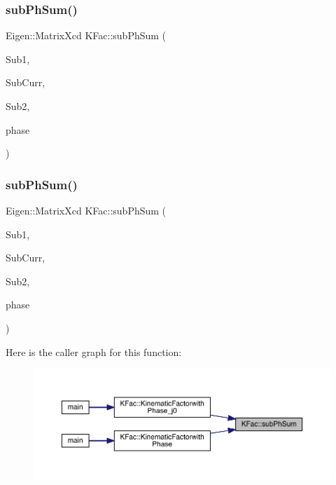 \subsubsection{\texorpdfstring{subPhSum()}{subPhSum()}\hspace{0.1cm}{\footnotesize\ttfamily [1/2]}}
{\footnotesize\ttfamily Eigen\+::\+Matrix\+Xcd K\+Fac\+::sub\+Ph\+Sum (\begin{DoxyParamCaption}\item[{map$<$ int, Eigen\+::\+Matrix\+Xcd $>$ \&}]{Sub1,  }\item[{Eigen\+::\+Matrix\+Xcd \&}]{Sub\+Curr,  }\item[{map$<$ int, Eigen\+::\+Matrix\+Xcd $>$ \&}]{Sub2,  }\item[{\mbox{\hyperlink{structPh_1_1phChars}{Ph\+::ph\+Chars}} \&}]{phase }\end{DoxyParamCaption})}

\mbox{\label{namespaceKFac_ac23a25c1e9762e3c46e69835193075df}} 
\subsubsection{\texorpdfstring{subPhSum()}{subPhSum()}\hspace{0.1cm}{\footnotesize\ttfamily [2/2]}}
{\footnotesize\ttfamily Eigen\+::\+Matrix\+Xcd K\+Fac\+::sub\+Ph\+Sum (\begin{DoxyParamCaption}\item[{map$<$ int, Eigen\+::\+Matrix\+Xcd $>$ \&}]{Sub1,  }\item[{map$<$ int, Eigen\+::\+Matrix\+Xcd $>$ \&}]{Sub\+Curr,  }\item[{map$<$ int, Eigen\+::\+Matrix\+Xcd $>$ \&}]{Sub2,  }\item[{\mbox{\hyperlink{structPh_1_1phChars}{Ph\+::ph\+Chars}} \&}]{phase }\end{DoxyParamCaption})}

Here is the caller graph for this function\+:
\nopagebreak
\begin{figure}[H]
\begin{center}
\leavevmode
\includegraphics[width=350pt]{d2/d89/namespaceKFac_ac23a25c1e9762e3c46e69835193075df_icgraph}
\end{center}
\end{figure}
\mbox{\label{namespaceKFac_abb86856b8424632f8f879408ce2cc05b}} 
